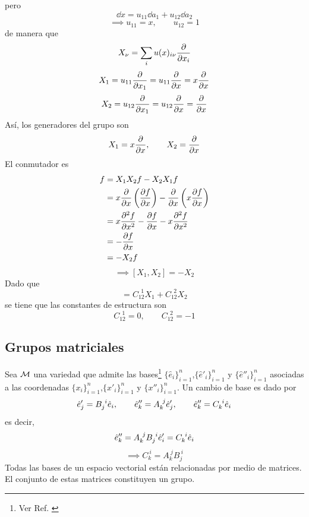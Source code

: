 \begin{sol}
pero
\begin{equation}
  \dd x=u_{11}\dd a_1+u_{12}\dd a_2
\end{equation}
\begin{equation}
  \implies u_{11}=x,\qquad u_{12}=1
\end{equation}
de manera que 
\begin{equation}
  X_{\nu }=\sum_i u(x)_{i\nu} \pdv{x_i}
\end{equation}
\begin{equation}
  X_1=u_{11}\pdv{x_1}=u_{11}\pdv{x}=x\pdv{x}
\end{equation}
\begin{equation}
  X_2=u_{12}\pdv{x_1}=u_{12}\pdv{x}=\pdv{x}
\end{equation}
Así, los generadores del grupo son
\begin{equation}
  X_1=x\pdv{x},\qquad X_2=\pdv{x}
\end{equation}
El conmutador es
\begin{align}
  [X_1,X_2]f&=X_1X_2f-X_2X_1f\\
  &=x\pdv{x}\left(\pdv{f}{x}\right)-\pdv{x}\left(x\pdv{f}{x}\right)\\
  &=x\pdv[2]{f}{x}-\pdv{f}{x}-x\pdv[2]{f}{x}\\
  &=-\pdv{f}{x}\\
  &=-X_2 f
\end{align}
\begin{equation}
  \implies [X_1,X_2]=-X_2
\end{equation}
Dado que
\begin{equation}
  [X_1,X_2]=C_{12}^{~~1}X_1+C_{12}^{~~2}X_2
\end{equation}
se tiene que las constantes de estructura son
\begin{equation}
  C_{12}^{~~1}=0,\qquad C_{12}^{~~2}=-1
\end{equation}
\end{sol}

\subsection{Grupos matriciales}
Sea $\mathcal{M}$ una variedad que admite las bases\footnote{Ver Ref. \cite{book:176834}} $\{\hat{e}_i\}_{i=1}^n$,$\{\hat{e}'_i\}_{i=1}^n$ y $\{\hat{e}''_i\}_{i=1}^n$ asociadas a las coordenadas $\{x_i\}_{i=1}^n$,$\{x'_i\}_{i=1}^n$ y $\{x''_i\}_{i=1}^n$. Un cambio de base es dado por
\begin{equation}
  \hat{e}'_j=B_j^{~i}\hat{e}_i,\qquad \hat{e}''_k=A_k^{~j}\hat{e} '_j,\qquad \hat{e}''_k=C_k^{~i}\hat{e} _i
\end{equation}
es decir,
\begin{equation}
  \hat{e}''_k=A_k^{~j}B_j^{~i}\hat{e}'_i=C_k^{~i}\hat{e} _i
\end{equation}
\begin{equation}
  \implies \boxed{C_k^{~i}=A_k^{~j}B_j^{~i}}
\end{equation}
Todas las bases de un espacio vectorial están relacionadas por medio de matrices. El conjunto de estas matrices constituyen un grupo.

